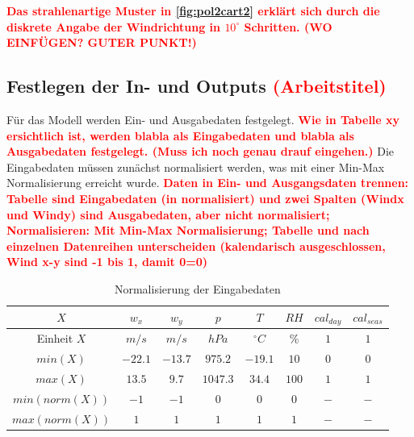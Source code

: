 \documentclass[
12pt, %
toc=listofnumbered, %
toc=chapterentrydotfill, %
numbers=noenddot, %
captions=tableheading, %
bibliography=numbered
]{scrreprt}
\let\Oldsubsection\subsection
\renewcommand{\subsection}{\FloatBarrier\Oldsubsection}
\newcommand{\highlight}[1]{\textbf{\textcolor{red}{#1}}}
\newcommand{\Abb}[1]{\autoref{fig:#1}}
\begin{document}
\highlight{Das strahlenartige Muster in \Abb{pol2cart2} erklärt sich durch die diskrete Angabe der Windrichtung in $10^\circ$ Schritten. (WO EINFÜGEN? GUTER PUNKT!)}

\subsection{Festlegen der In- und Outputs \highlight{(Arbeitstitel)}}
Für das Modell werden Ein- und Ausgabedaten festgelegt. \highlight{Wie in Tabelle xy ersichtlich ist, werden blabla als Eingabedaten und blabla als Ausgabedaten festgelegt. (Muss ich noch genau drauf eingehen.)} Die Eingabedaten müssen zunächst normalisiert werden, was mit einer Min-Max Normalisierung erreicht wurde.
\highlight{Daten in Ein- und Ausgangsdaten trennen: Tabelle sind Eingabedaten (in normalisiert) und zwei Spalten (Windx und Windy) sind Ausgabedaten, aber nicht normalisiert; 
Normalisieren: Mit  Min-Max Normalisierung; Tabelle und nach einzelnen Datenreihen unterscheiden (kalendarisch ausgeschlossen, Wind x-y sind -1 bis 1, damit 0=0)}

\begin{table}[ht]
	\centering
	\caption{Normalisierung der Eingabedaten}
	\begin{tabular}{|c|c|c|c|c|c|c|c|}
		\hline
		\rowcolor{color80}
		\textbf{$X$} & \textbf{$w_x$} & \textbf{$w_y$} & \textbf{$p$} & \textbf{$T$} & \textbf{$RH$} & \textbf{$cal_{day}$} & \textbf{$cal_{seas}$} \\ \hline
		Einheit $X$ & $m/s$ & $m/s$ & $hPa$ & $^\circ C$ & \% & $1$ & $1$ \\ \hline
		$min(X)$       & $-22.1$ & $-13.7$ & $975.2$ & $-19.1$ & $10$ & $0$ & $0$ \\ \hline
		$max(X)$       & $13.5$ & $9.7$ & $1047.3$ & $34.4$ & $100$ & $1$ & $1$ \\ \hline
		$min(norm(X))$ & $-1$ & $-1$ & $0$ & $0$ & $0$ & $-$ & $-$ \\ \hline
		$max(norm(X))$ & $1$ & $1$ & $1$ & $1$ & $1$ & $-$ & $-$ \\ \hline
	\end{tabular}
\label{tab:normalisierung}
\end{table}
\end{document}
